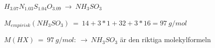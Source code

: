 \documentclass[12pt, letterpaper, twoside]{article}
\begin{document}
\begin{flushleft}
\begin{itemize}
\begin{itemize}
\hfill

$ H_{3.07}N_{1.03}S_{1.04}O_{3.09}\ \rightarrow\ NH_3SO_3 $

$ M_{empirisk}(NH_3SO_3)\ =\ 14+3*1+32+3*16 = 97\ g/mol $

$ M(HX)\ =\ 97\ g/mol:\ \rightarrow\ NH_3SO_3 $ är den riktiga molekylformeln




\end{itemize}
\end{itemize}
\end{flushleft}



\end{document}
